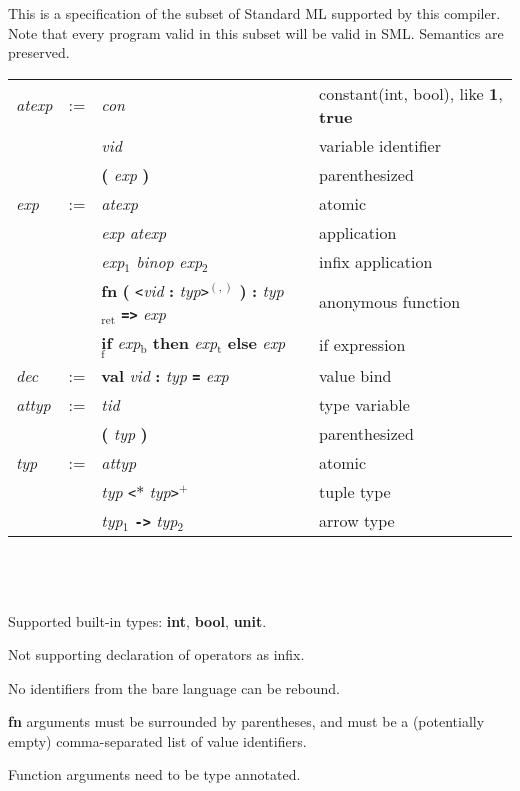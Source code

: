 \documentclass[12pt]{article}
\author{Andrey Yao}
\newcommand{\gm}[1]{\textit{#1}} %
\newcommand{\kw}[1]{\textbf{#1}} %
\newcommand{\hd}[1]{ \gm{#1} & := }
\newcommand{\row}[2]{ & #1 &  & #2\\}
\newcommand{\newrow}[2]{ & &#1 & &#2\\}
\begin{document}
This is a specification of the subset of Standard ML supported by this compiler. Note that every program valid in this subset will be valid in SML. Semantics are preserved.

\begin{tabular}{l l l l l}
  \hline %
  \hd{atexp}
  \row{\gm{con}}{constant(int, bool), like \kw{1}, \kw{true} }
  \newrow{\gm{vid}}{variable identifier}
  \newrow{\kw{(} \gm{exp} \kw{)}}{parenthesized}
  \hd{exp}
  \row{\gm{atexp}}{atomic}
  \newrow{\gm{exp} \gm{atexp}}{application}
  \newrow{\gm{exp}$_1$ \gm{binop} \gm{exp}$_2$}{infix application}
  \newrow{\kw{fn} \kw{(} \texttt{<}\gm{vid} \kw{:} \gm{typ}\texttt{>}$^{(,)}$ \kw{)} \kw{:} \gm{typ}$_\text{ret}$ \kw{\texttt{=>}} \gm{exp}}{anonymous function}
  \newrow{\kw{if} \gm{exp}$_\text{b}$ \kw{then} \gm{exp}$_\text{t}$ \kw{else} \gm{exp}$_\text{f}$}{if expression}
  \hd{dec}
  \row{\kw{val} \gm{vid} \kw{:} \gm{typ} \kw{\texttt{=}} \gm{exp}}{value bind}
  \hline %
  \hd{attyp}
  \row{\gm{tid}}{type variable}
  \newrow{\kw{(} \gm{typ} \kw{)}}{parenthesized}
  \hd{typ}
  \row{\gm{attyp}}{atomic}
  \newrow{\gm{typ} \texttt{<}{\bf$*$} \gm{typ}\texttt{>}$^+$}{tuple type}
  \newrow{\gm{typ}$_1$ \kw{\texttt{->}} \gm{typ}$_2$}{arrow type}
\end{tabular}
\\\\\\

Supported built-in types: \kw{int}, \kw{bool}, \kw{unit}.

Not supporting declaration of operators as infix.

No identifiers from the bare language can be rebound.

\kw{fn} arguments must be surrounded by parentheses, and must be a (potentially empty) comma-separated list of value identifiers.

Function arguments need to be type annotated.
\end{document}
